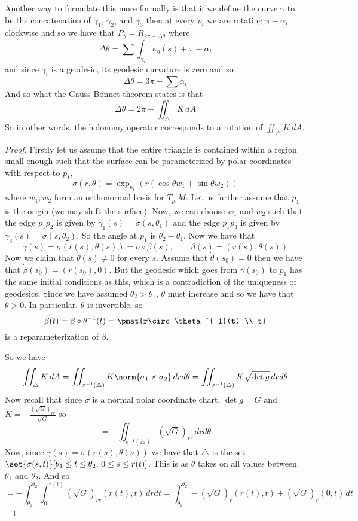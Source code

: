 Another way to formulate this more formally is that if we define the curve $\gamma$ to be the concatenation of $\gamma_1$, $\gamma_2$, and $\gamma_3$ then at every $p_i$ we are rotating $\pi-\alpha_i$
clockwise and so we have that $P_\gamma=R_{2\pi-\Delta\theta}$ where
\[ \Delta\theta = \sum\int_{\gamma_i}\kappa_g(s) + \pi - \alpha_i \]
and since $\gamma_i$ is a geodesic, its geodesic curvature is zero and so
\[ \Delta\theta = 3\pi - \sum\alpha_i \]
And so what the Gauss-Bonnet theorem states is that
\[ \Delta\theta = 2\pi - \iint_\triangle K\,dA \]
So in other words, the holonomy operator corresponds to a rotation of $\iint_\triangle K\,dA$.

\begin{proof}

    Firstly let us assume that the entire triangle is contained within a region small enough such that the surface can be parameterized by polar coordinates with respect to $p_1$,
    \[ \sigma(r,\theta) = \exp_{p_1}(r(\cos\theta w_1+\sin\theta w_2)) \]
    where $w_1,w_2$ form an orthonormal basis for $T_{p_1}M$.
    Let us further assume that $p_1$ is the origin (we may shift the surface).
    Now, we can choose $w_1$ and $w_2$ such that the edge $p_1p_2$ is given by $\gamma_1(s)=\sigma(s,\theta_1)$ and the edge $p_1p_3$ is given by $\gamma_3(s)=\sigma(s,\theta_2)$.
    So the angle at $p_1$ is $\theta_2-\theta_1$.
    Now we have that
    \[ \gamma(s) = \sigma(r(s),\theta(s)) = \sigma\circ\beta(s),\qquad \beta(s) = (r(s),\theta(s)) \]
    Now we claim that $\dot\theta(s)\neq0$ for every $s$.
    Assume that $\dot\theta(s_0)=0$ then we have that $\dot\beta(s_0)=(\dot r(s_0),0)$.
    But the geodesic which goes from $\gamma(s_0)$ to $p_1$ has the same initial conditions as this, which is a contradiction of the uniqueness of geodesics.
    Since we have assumed $\theta_2>\theta_1$, $\theta$ must increase and so we have that $\dot\theta>0$.
    In particular, $\theta$ is invertible, so
    \[ \tilde\beta(t) = \beta\circ\theta^{-1}(t) = \pmat{r\circ\theta^{-1}(t) \\ t} \]
    is a reparameterization of $\beta$.

    So we have
    \[ \iint_\triangle K\,dA = \iint_{\sigma^{-1}(\triangle)}K\norm{\sigma_1\times\sigma_2}\,drd\theta = \iint_{\sigma^{-1}(\triangle)}K\sqrt{\det g}\,drd\theta \]
    Now recall that since $\sigma$ is a normal polar coordinate chart, $\det g=G$ and $K=-\frac{(\sqrt G)_{rr}}{\sqrt G}$ so
    \[ = -\iint_{\sigma^{-1}(\triangle)}(\sqrt G)_{rr}\,drd\theta \]
    Now, since $\gamma(s)=\sigma(r(s),\theta(s))$ we have that $\triangle$ is the set $\set{\sigma(s,t)}[\theta_1\leq t\leq\theta_2,\,0\leq s\leq r(t)]$.
    This is as $\theta$ takes on all values between $\theta_1$ and $\theta_2$.
    And so
    \[ = -\int_{\theta_1}^{\theta_2}\int_0^{r(t)}(\sqrt G)_{rr}(r(t),t)\,drdt = \int_{\theta_1}^{\theta_2}-(\sqrt G)_r(r(t),t) + (\sqrt G)_r(0,t)\,dt \]


\end{proof}
